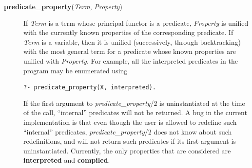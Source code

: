 \begin{description}
\item[{\bf predicate\_property}({\em Term}, {\em Property})]
    If {\em Term} is a term whose principal functor is a predicate,
    {\em Property} is unified with the currently known properties of the
    corresponding predicate.
    If {\em Term} is a variable, then it is unified (successively,
    through backtracking) with the most general term for a
    predicate whose known properties are unified with {\em Property}.
    For example, all the interpreted predicates in the program may be enumerated
    using
    \begin{center}
    {\tt ?- predicate\_property(X, interpreted).}
    \end{center}
    If the first argument to {\em predicate\_property}/2
    is uninstantiated at the time of the call,
    ``internal'' predicates will not be returned.
    A bug in the current implementation is that even though the user is allowed
    to redefine such ``internal'' predicates,
    {\em predicate\_property}/2 does not know about such redefinitions,
    and will not return such predicates if its first argument is uninstantiated.
    Currently, the only properties that are considered are
    {\bf interpreted} and {\bf compiled}.
\end{description}

